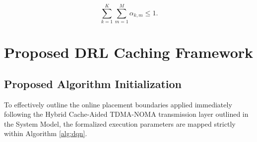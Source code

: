 \documentclass[conference]{IEEEtran}
\begin{document}
\begin{equation}
\sum_{k=1}^{K}
\sum_{m=1}^{M}
\alpha_{k,m}
\le 1.
\end{equation}


\section{Proposed DRL Caching Framework}

\subsection{Proposed Algorithm Initialization}
To effectively outline the online placement boundaries applied immediately following the Hybrid Cache-Aided TDMA-NOMA transmission layer outlined in the System Model, the formalized execution parameters are mapped strictly within Algorithm \ref{alg:dqn}.
\end{document}
